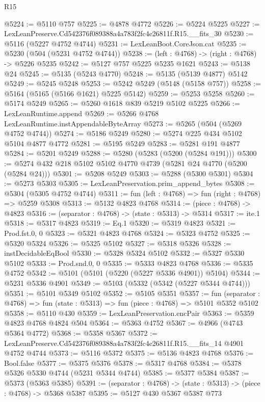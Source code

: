 \begin{lexlean}{R15}
\begin{coremodule}
{{{{{{{{{{{@5224 := @5110 @757
@5225 := @4878 @4772
@5226 := @5224 @5225
@5227 := LexLeanPreserve.Cd542376f089388a4a783f2fc4c26811f.R15.__fits_30
@5230 := @5116 (@5227 @4752 @4744)
@5231 := LexLeanBoot.CoreJson.cat
@5235 := @5230 (@504 (@5231 @4752 @4744))
@5238 := (left : @4768) -> (right : @4768) -> @5226 @5235
@5242 := @5127 @757 @5225 @5235 @1621
@5243 := @5138 @24
@5245 := @5135 (@5243 @4770)
@5248 := @5135 (@5139 @4877) @5142
@5249 := @5245 @5248
@5253 := @5242 @5249 (@5148 (@5158 @757))
@5258 := @5164 (@5165 (@5166 @1621) @5225 @5142)
@5259 := @5253 @5258
@5260 := @5174 @5249
@5265 := @5260 @1618 @839 @5219 @5102 @5225
@5266 := LexLeanRuntime.append
@5269 := @5266 @4768 LexLeanRuntime.instAppendableByteArray
@5273 := @5265 (@504 (@5269 @4752 @4744))
@5274 := @5186 @5249
@5280 := @5274 @225 @434 @5102 @5104 @4877 @4772
@5281 := @5195 @5249
@5283 := @5281 @191 @4877
@5284 := @5201 @5249
@5288 := @5280 (@5283 (@5200 (@5284 @191)))
@5300 := @5274 @432 @218 @5102 @5102 @4770 @4739 (@5281 @24 @4770 (@5200 (@5284 @24)))
@5301 := @5208 @5249
@5303 := @5288 (@5300 @5301)
@5304 := @5273 @5303
@5305 := LexLeanPreservation.prim_append_bytes
@5308 := @5304 (@5305 @4752 @4744)
@5311 := fun (left : @4768) => fun (right : @4768) => @5259 @5308
@5313 := @5132 @4823 @4768
@5314 := (piece : @4768) -> @4823
@5316 := (separator : @4768) -> (state : @5313) -> @5314
@5317 := ite.{1}
@5318 := @5317 @4823
@5319 := Eq.{1}
@5320 := @5319 @4823
@5321 := Prod.fst.{0, 0}
@5323 := @5321 @4823 @4768
@5324 := @5323 @4752
@5325 := @5320 @5324
@5326 := @5325 @5102
@5327 := @5318 @5326
@5328 := instDecidableEqBool
@5330 := @5328 @5324 @5102
@5332 := @5327 @5330 @5102
@5333 := Prod.snd.{0, 0}
@5335 := @5333 @4823 @4768
@5336 := @5335 @4752
@5342 := @5101 (@5101 (@5220 (@5227 @5336 @4901)) @5104)
@5344 := @5231 @5336 @4901
@5349 := @5103 (@5332 (@5342 (@5227 @5344 @4744)))
@5351 := @5101 @5349 @5102
@5352 := @5105 @5351
@5357 := fun (separator : @4768) => fun (state : @5313) => fun (piece : @4768) => @5101 @5352 @5102
@5358 := @5110 @430
@5359 := LexLeanPreservation.encPair
@5363 := @5359 @4823 @4768 @4824 @504
@5364 := @5363 @4752
@5367 := @4966 (@4743 @5364 @4772)
@5368 := @5358 @5367
@5372 := LexLeanPreserve.Cd542376f089388a4a783f2fc4c26811f.R15.__fits_14 @4901 @4752 @4744
@5373 := @5116 @5372
@5375 := @5136 @4823 @4768
@5376 := Bool.false
@5377 := @5375 @5376
@5378 := @5317 @4768
@5384 := @5378 @5326 @5330 @4744 (@5231 @5344 @4744)
@5385 := @5377 @5384
@5387 := @5373 (@5363 @5385)
@5391 := (separator : @4768) -> (state : @5313) -> (piece : @4768) -> @5368 @5387
@5395 := @5127 @430 @5367 @5387 @773
}}}}}}}}}}}
\end{coremodule}
\end{lexlean}
